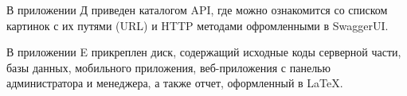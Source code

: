 В приложении Д приведен каталогом API,
где можно ознакомится со списком картинок с их путями (URL) и HTTP методами офромленными в SwaggerUI.

В приложении E
прикреплен диск, содержащий исходные коды серверной части, базы данных,
мобильного приложения, веб-приложения с панелью администратора и менеджера,
а также отчет, оформленный в LaTeX.


\newpage
